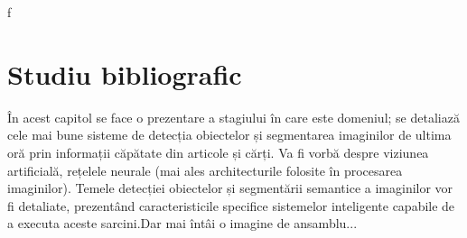 f%
\chapter{Studiu bibliografic}
\label{cap:studiu-bibliografic}
În acest capitol se face o prezentare a stagiului în care este domeniul; se detaliază cele mai bune sisteme de detecția obiectelor și segmentarea imaginilor de ultima oră prin informații căpătate din articole și cărți.\newline
Va fi vorbă despre viziunea artificială, rețelele neurale (mai ales architecturile folosite în procesarea imaginilor). Temele detecției obiectelor și segmentării semantice a imaginilor vor fi detaliate, prezentând caracteristicile specifice sistemelor inteligente capabile de a executa aceste sarcini.Dar mai întâi o imagine de ansamblu...\newline
